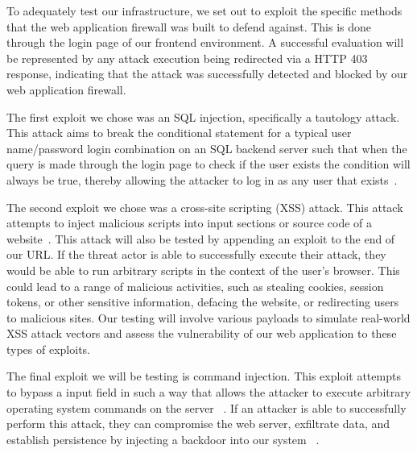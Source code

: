 To adequately test our infrastructure, we set out to exploit the specific methods that the web application firewall was built to defend against. This is done through the login page of our frontend environment. A successful evaluation will be represented by any attack execution being redirected via a HTTP 403 response, indicating that the attack was successfully detected and blocked by our web application firewall.

The first exploit we chose was an SQL injection, specifically a tautology attack. This attack aims to break the conditional statement for a typical user name/password login combination on an SQL backend server such that when the query is made through the login page to check if the user exists the condition will always be true, thereby allowing the attacker to log in as any user that exists~\cite{tautology}.

The second exploit we chose was a cross-site scripting (XSS) attack. This attack attempts to inject malicious scripts into input sections or source code of a website~\cite{xss}. This attack will also be tested by appending an exploit to the end of our URL. If the threat actor is able to successfully execute their attack, they would be able to run arbitrary scripts in the context of the user's browser. This could lead to a range of malicious activities, such as stealing cookies, session tokens, or other sensitive information, defacing the website, or redirecting users to malicious sites. Our testing will involve various payloads to simulate real-world XSS attack vectors and assess the vulnerability of our web application to these types of exploits.

The final exploit we will be testing is command injection. This exploit attempts to bypass a input field in such a way that allows the attacker to execute arbitrary operating system commands on the server ~\cite{cmd_injection}. If an attacker is able to successfully perform this attack, they can compromise the web server, exfiltrate data, and establish persistence by injecting a backdoor into our system ~\cite{backdoor}. 